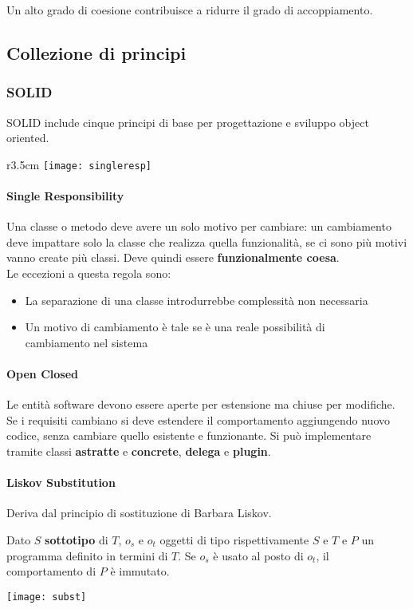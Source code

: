 \begin{observation}
	Un alto grado di coesione contribuisce a ridurre il grado di accoppiamento.
\end{observation}

\subsection{Collezione di principi}
\subsubsection{SOLID}
SOLID include cinque principi di base per progettazione e sviluppo object oriented.
\begin{wrapfigure}[5]{r}{3.5cm}
	\texttt{[image: singleresp]}
\end{wrapfigure}
\paragraph{Single Responsibility} Una classe o metodo deve avere un solo motivo per cambiare: un cambiamento deve impattare solo la classe che realizza quella funzionalità, se ci sono più motivi vanno create più classi. Deve quindi essere \textbf{funzionalmente coesa}.\\
Le eccezioni a questa regola sono:
\begin{itemize}
	\item La separazione di una classe introdurrebbe complessità non necessaria
	\item Un motivo di cambiamento è tale se è una reale possibilità di \\cambiamento nel sistema
\end{itemize}

\paragraph{Open Closed} Le entità software devono essere aperte per estensione ma chiuse per modifiche. Se i requisiti cambiano si deve estendere il comportamento aggiungendo nuovo codice, senza cambiare quello esistente e funzionante. Si può implementare tramite classi \textbf{astratte} e \textbf{concrete}, \textbf{delega} e \textbf{plugin}.

\paragraph{Liskov Substitution}
Deriva dal principio di sostituzione di Barbara Liskov.
\begin{definition}
	Dato $S$ \textbf{sottotipo} di $T$, $o_s$ e $o_t$ oggetti di tipo rispettivamente $S$ e $T$ e $P$ un programma definito in termini di $T$. Se $o_s$ è usato al posto di $o_t$, il comportamento di $P$ è immutato. 
\end{definition}
\begin{center}
	\texttt{[image: subst]}
\end{center}

